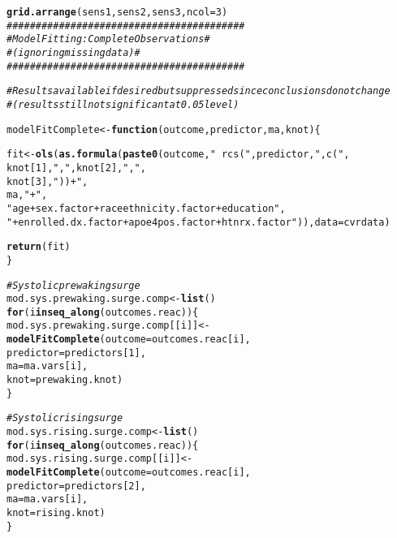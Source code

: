 \documentclass[10pt]{article}\usepackage[]{graphicx}\usepackage[]{color}
\makeatletter
\newcommand{\hlnum}[1]{\textcolor[rgb]{0.686,0.059,0.569}{#1}}%
\newcommand{\hlstr}[1]{\textcolor[rgb]{0.192,0.494,0.8}{#1}}%
\newcommand{\hlcom}[1]{\textcolor[rgb]{0.678,0.584,0.686}{\textit{#1}}}%
\newcommand{\hlstd}[1]{\textcolor[rgb]{0.345,0.345,0.345}{#1}}%
\newcommand{\hlkwa}[1]{\textcolor[rgb]{0.161,0.373,0.58}{\textbf{#1}}}%
\newcommand{\hlkwb}[1]{\textcolor[rgb]{0.69,0.353,0.396}{#1}}%
\newcommand{\hlkwc}[1]{\textcolor[rgb]{0.333,0.667,0.333}{#1}}%
\newcommand{\hlkwd}[1]{\textcolor[rgb]{0.737,0.353,0.396}{\textbf{#1}}}%
\newenvironment{kframe}{%
 \def\at@end@of@kframe{}%
 \ifinner\ifhmode%
  \def\at@end@of@kframe{\end{minipage}}%
  \begin{minipage}{\columnwidth}%
 \fi\fi%
 \def\FrameCommand##1{\hskip\@totalleftmargin \hskip-\fboxsep
 \colorbox{shadecolor}{##1}\hskip-\fboxsep
     \hskip-\linewidth \hskip-\@totalleftmargin \hskip\columnwidth}%
 \MakeFramed {\advance\hsize-\width
   \@totalleftmargin\z@ \linewidth\hsize
   \@setminipage}}%
 {\par\unskip\endMakeFramed%
 \at@end@of@kframe}
\newenvironment{knitrout}{}{} %
\makeatother
\begin{document}
\begin{knitrout}
\begin{kframe}
\begin{alltt}
\hlkwd{grid.arrange}\hlstd{(sens1, sens2, sens3,} \hlkwc{ncol} \hlstd{=} \hlnum{3}\hlstd{)}
\hlcom{#########################################}
\hlcom{#  Model Fitting: Complete Observations #}
\hlcom{#  (ignoring missing data)              #}
\hlcom{#########################################}

\hlcom{#Results available if desired but suppressed since conclusions do not change}
\hlcom{#  (results still not significant at 0.05 level)}

\hlstd{modelFitComplete} \hlkwb{<-} \hlkwa{function}\hlstd{(}\hlkwc{outcome}\hlstd{,} \hlkwc{predictor}\hlstd{,} \hlkwc{ma}\hlstd{,} \hlkwc{knot}\hlstd{)\{}

  \hlstd{fit} \hlkwb{<-} \hlkwd{ols}\hlstd{(}\hlkwd{as.formula}\hlstd{(}\hlkwd{paste0}\hlstd{(outcome,} \hlstr{"~ rcs("}\hlstd{, predictor,} \hlstr{", c("}\hlstd{,}
                                           \hlstd{knot[}\hlnum{1}\hlstd{],}\hlstr{","}\hlstd{, knot[}\hlnum{2}\hlstd{],}\hlstr{","}\hlstd{,}
                                           \hlstd{knot[}\hlnum{3}\hlstd{],}\hlstr{")) +"}\hlstd{,}
                                           \hlstd{ma,} \hlstr{"+"}\hlstd{,}
\hlstr{"age + sex.factor + raceethnicity.factor + education"}\hlstd{,}
\hlstr{"+ enrolled.dx.factor + apoe4pos.factor + htnrx.factor"}\hlstd{)),} \hlkwc{data} \hlstd{= cvrdata)}

  \hlkwd{return}\hlstd{(fit)}
\hlstd{\}}


\hlcom{#Systolic prewaking surge}
\hlstd{mod.sys.prewaking.surge.comp} \hlkwb{<-} \hlkwd{list}\hlstd{()}
\hlkwa{for}\hlstd{(i} \hlkwa{in} \hlkwd{seq_along}\hlstd{(outcomes.reac))\{}
  \hlstd{mod.sys.prewaking.surge.comp[[i]]} \hlkwb{<-} \hlkwd{modelFitComplete}\hlstd{(}\hlkwc{outcome} \hlstd{= outcomes.reac[i],}
                                                   \hlkwc{predictor} \hlstd{= predictors[}\hlnum{1}\hlstd{],}
                                                   \hlkwc{ma} \hlstd{= ma.vars[i],}
                                                   \hlkwc{knot} \hlstd{= prewaking.knot)}
\hlstd{\}}

\hlcom{#Systolic rising surge}
\hlstd{mod.sys.rising.surge.comp} \hlkwb{<-} \hlkwd{list}\hlstd{()}
\hlkwa{for}\hlstd{(i} \hlkwa{in} \hlkwd{seq_along}\hlstd{(outcomes.reac))\{}
  \hlstd{mod.sys.rising.surge.comp[[i]]} \hlkwb{<-} \hlkwd{modelFitComplete}\hlstd{(}\hlkwc{outcome} \hlstd{= outcomes.reac[i],}
                                                   \hlkwc{predictor} \hlstd{= predictors[}\hlnum{2}\hlstd{],}
                                                   \hlkwc{ma} \hlstd{= ma.vars[i],}
                                                   \hlkwc{knot} \hlstd{= rising.knot)}
\hlstd{\}}


\end{alltt}
\end{kframe}
\end{knitrout}
\end{document}
